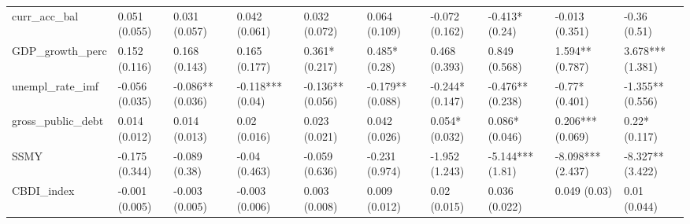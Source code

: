 \begin{table}[ht]
\begin{tabular}{llllllllll}
  curr\_acc\_bal & 0.051 (0.055) & 0.031 (0.057) & 0.042 (0.061) & 0.032 (0.072) & 0.064 (0.109) & -0.072 (0.162) & -0.413* (0.24) & -0.013 (0.351) & -0.36 (0.51) \\ 
  GDP\_growth\_perc & 0.152 (0.116) & 0.168 (0.143) & 0.165 (0.177) & 0.361* (0.217) & 0.485* (0.28) & 0.468 (0.393) & 0.849 (0.568) & 1.594** (0.787) & 3.678*** (1.381) \\ 
  unempl\_rate\_imf & -0.056 (0.035) & -0.086** (0.036) & -0.118*** (0.04) & -0.136** (0.056) & -0.179** (0.088) & -0.244* (0.147) & -0.476** (0.238) & -0.77* (0.401) & -1.355** (0.556) \\ 
  gross\_public\_debt & 0.014 (0.012) & 0.014 (0.013) & 0.02 (0.016) & 0.023 (0.021) & 0.042 (0.026) & 0.054* (0.032) & 0.086* (0.046) & 0.206*** (0.069) & 0.22* (0.117) \\ 
  SSMY & -0.175 (0.344) & -0.089 (0.38) & -0.04 (0.463) & -0.059 (0.636) & -0.231 (0.974) & -1.952 (1.243) & -5.144*** (1.81) & -8.098*** (2.437) & -8.327** (3.422) \\ 
  CBDI\_index & -0.001 (0.005) & -0.003 (0.005) & -0.003 (0.006) & 0.003 (0.008) & 0.009 (0.012) & 0.02 (0.015) & 0.036 (0.022) & 0.049 (0.03) & 0.01 (0.044) \\ 
   \bottomrule
\end{tabular}
\endgroup
\end{table}
